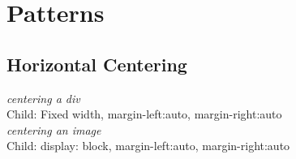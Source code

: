 \chapter{Patterns}


\section{Horizontal Centering}

\textit{centering a div}\\
Child: Fixed width, margin-left:auto, margin-right:auto\\

\textit{centering an image}\\
Child: display: block, margin-left:auto, margin-right:auto\\